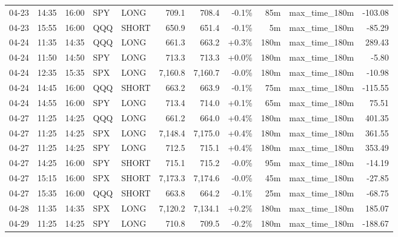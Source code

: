 \documentclass[11pt,a4paper,twoside]{article}
\begin{document}
\begin{center}
\begin{longtable}{>{\color{txtmain}}l l l l l r r r r >{\color{txtmain}}l r}
04-23 & 14:35 & 16:00 & SPY & LONG & 709.1 & 708.4 & \textcolor{lossred}{-0.1\%} & 85m & max\_time\_180m & \textcolor{lossred}{-103.08} \\
04-23 & 15:55 & 16:00 & QQQ & SHORT & 650.9 & 651.4 & \textcolor{lossred}{-0.1\%} & 5m & max\_time\_180m & \textcolor{lossred}{-85.29} \\
04-24 & 11:35 & 14:35 & QQQ & LONG & 661.3 & 663.2 & \textcolor{wingreen}{+0.3\%} & 180m & max\_time\_180m & \textcolor{wingreen}{289.43} \\
04-24 & 11:50 & 14:50 & SPY & LONG & 713.3 & 713.3 & \textcolor{wingreen}{+0.0\%} & 180m & max\_time\_180m & \textcolor{lossred}{-5.80} \\
04-24 & 12:35 & 15:35 & SPX & LONG & 7,160.8 & 7,160.7 & \textcolor{lossred}{-0.0\%} & 180m & max\_time\_180m & \textcolor{lossred}{-10.98} \\
04-24 & 14:45 & 16:00 & QQQ & SHORT & 663.2 & 663.9 & \textcolor{lossred}{-0.1\%} & 75m & max\_time\_180m & \textcolor{lossred}{-115.55} \\
04-24 & 14:55 & 16:00 & SPY & LONG & 713.4 & 714.0 & \textcolor{wingreen}{+0.1\%} & 65m & max\_time\_180m & \textcolor{wingreen}{75.51} \\
04-27 & 11:25 & 14:25 & QQQ & LONG & 661.2 & 664.0 & \textcolor{wingreen}{+0.4\%} & 180m & max\_time\_180m & \textcolor{wingreen}{401.35} \\
04-27 & 11:25 & 14:25 & SPX & LONG & 7,148.4 & 7,175.0 & \textcolor{wingreen}{+0.4\%} & 180m & max\_time\_180m & \textcolor{wingreen}{361.55} \\
04-27 & 11:25 & 14:25 & SPY & LONG & 712.5 & 715.1 & \textcolor{wingreen}{+0.4\%} & 180m & max\_time\_180m & \textcolor{wingreen}{353.49} \\
04-27 & 14:25 & 16:00 & SPY & SHORT & 715.1 & 715.2 & \textcolor{lossred}{-0.0\%} & 95m & max\_time\_180m & \textcolor{lossred}{-14.19} \\
04-27 & 15:15 & 16:00 & SPX & SHORT & 7,173.3 & 7,174.6 & \textcolor{lossred}{-0.0\%} & 45m & max\_time\_180m & \textcolor{lossred}{-27.85} \\
04-27 & 15:35 & 16:00 & QQQ & SHORT & 663.8 & 664.2 & \textcolor{lossred}{-0.1\%} & 25m & max\_time\_180m & \textcolor{lossred}{-68.75} \\
04-28 & 11:35 & 14:35 & SPX & LONG & 7,120.2 & 7,134.1 & \textcolor{wingreen}{+0.2\%} & 180m & max\_time\_180m & \textcolor{wingreen}{185.07} \\
04-29 & 11:25 & 14:25 & SPY & LONG & 710.8 & 709.5 & \textcolor{lossred}{-0.2\%} & 180m & max\_time\_180m & \textcolor{lossred}{-188.67} \\

\end{longtable}
\end{center}
\end{document}
